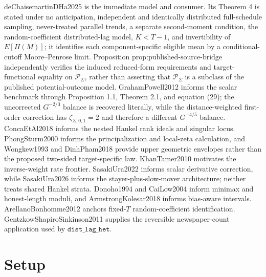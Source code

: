 \documentclass{article}
\begin{document}
deChaisemartinDHa2025 is the immediate model and consumer. Its Theorem 4 is stated under no anticipation, independent and identically distributed full-schedule sampling, never-treated parallel trends, a separate second-moment condition, the random-coefficient distributed-lag model, \(K<T-1\), and invertibility of \(E[\Pi(M)]\); it identifies each component-specific eligible mean by a conditional-cutoff Moore--Penrose limit. Proposition \(\text{prop:published-source-bridge}\) independently verifies the induced reduced-form requirements and target-functional equality on \(\mathcal P_\Sigma\), rather than asserting that \(\mathcal P_\Sigma\) is a subclass of the published potential-outcome model. GrahamPowell2012 informs the scalar benchmark through Proposition 1.1, Theorem 2.1, and equation (29); the uncorrected \(G^{-2/3}\) balance is recovered literally, while the distance-weighted first-order correction has \(\zeta_{\Sigma,0,1}=2\) and therefore a different \(G^{-4/5}\) balance. ConcaEtAl2018 informs the nested Hankel rank ideals and singular locus. PhongSturm2000 informs the principalization and local-zeta calculation, and Wongkew1993 and DinhPham2018 provide upper geometric envelopes rather than the proposed two-sided target-specific law. KhanTamer2010 motivates the inverse-weight rate frontier. SasakiUra2022 informs scalar derivative correction, while SasakiUra2026 informs the stayer-plus-slow-mover architecture; neither treats shared Hankel strata. Donoho1994 and CaiLow2004 inform minimax and honest-length moduli, and ArmstrongKolesar2018 informs bias-aware intervals. ArellanoBonhomme2012 anchors fixed-\(T\) random-coefficient identification. GentzkowShapiroSinkinson2011 supplies the reversible newspaper-count application used by \(\texttt{dist\_lag\_het}\).

\section{Setup}
\end{document}
